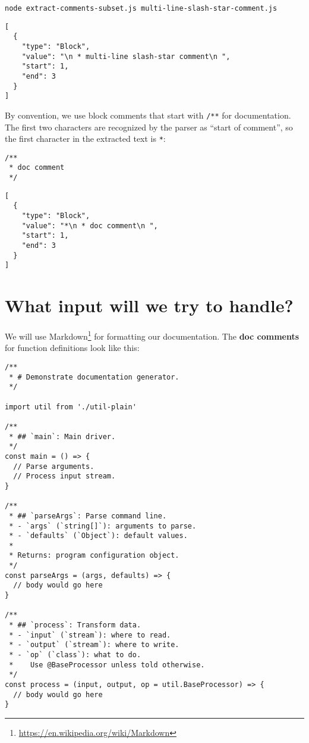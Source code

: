 \documentclass[krantzl]{krantz}
\newcommand{\glossref}[1]{\textbf{#1}}
\newcommand{\hreffoot}[2]{{#1}\footnote{\href{#2}{#2}}}
\begin{document}
\begin{lstlisting}[frame=shadowbox]
node extract-comments-subset.js multi-line-slash-star-comment.js
\end{lstlisting}



\begin{lstlisting}[frame=tblr,backgroundcolor=\color{black!5}]
[
  {
    "type": "Block",
    "value": "\n * multi-line slash-star comment\n ",
    "start": 1,
    "end": 3
  }
]
\end{lstlisting}



By convention,
we use block comments that start with \texttt{/**} for documentation.
The first two characters are recognized by the parser as “start of comment”,
so the first character in the extracted text is \texttt{*}:


\begin{lstlisting}[frame=tblr]
/**
 * doc comment
 */
\end{lstlisting}



\begin{lstlisting}[frame=tblr,backgroundcolor=\color{black!5}]
[
  {
    "type": "Block",
    "value": "*\n * doc comment\n ",
    "start": 1,
    "end": 3
  }
]
\end{lstlisting}


\section{What input will we try to handle?}\label{doc-generator-input}


We will use \hreffoot{Markdown}{https://en.wikipedia.org/wiki/Markdown} for formatting our documentation.
The \glossref{doc comments} for function definitions look like this:


\begin{lstlisting}[frame=tblr]
/**
 * # Demonstrate documentation generator.
 */

import util from './util-plain'

/**
 * ## `main`: Main driver.
 */
const main = () => {
  // Parse arguments.
  // Process input stream.
}

/**
 * ## `parseArgs`: Parse command line.
 * - `args` (`string[]`): arguments to parse.
 * - `defaults` (`Object`): default values.
 *
 * Returns: program configuration object.
 */
const parseArgs = (args, defaults) => {
  // body would go here
}

/**
 * ## `process`: Transform data.
 * - `input` (`stream`): where to read.
 * - `output` (`stream`): where to write.
 * - `op` (`class`): what to do.
 *    Use @BaseProcessor unless told otherwise.
 */
const process = (input, output, op = util.BaseProcessor) => {
  // body would go here
}
\end{lstlisting}
\end{document}
